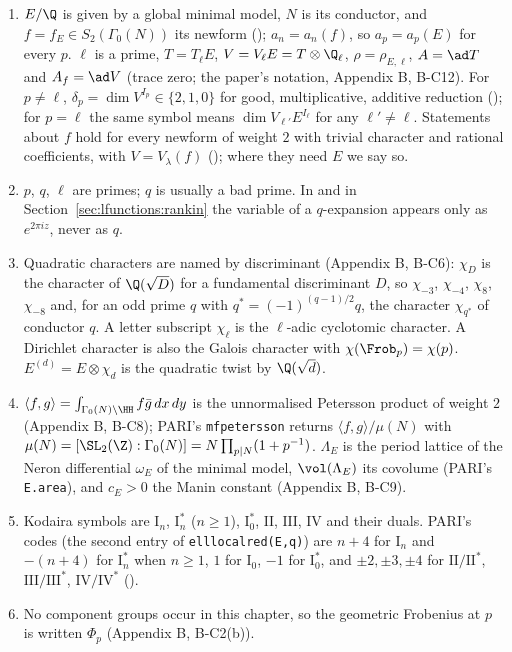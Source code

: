 \begin{convention}\label{conv:lfunctions:standing}
\begin{enumerate}[label=(\alph*)]
\item $E/\Q$ is given by a global minimal model, $N$ is its conductor, and $f=f_E\in S_2(\Gamma_0(N))$ its newform (); $a_n=a_n(f)$, so $a_p=a_p(E)$
for every $p$. $\ell$ is a prime, $T=T_\ell E$, $V=V_\ell E=T\otimes\Q_\ell$, $\rho=\rho_{E,\ell}$, $A=\ad T$ and $A_f=\ad V$ (trace zero; the paper's notation, Appendix B,
B-C12). For $p\ne\ell$, $\delta_p=\dim V^{I_p}\in\{2,1,0\}$ for good, multiplicative, additive reduction (); for $p=\ell$ the same symbol means
$\dim V_{\ell'}E^{I_\ell}$ for any $\ell'\ne\ell$. Statements about $f$ hold for every newform of weight $2$ with trivial character and rational coefficients,
with $V=V_\lambda(f)$ (); where they need $E$ we say so.
\item $p$, $q$, $\ell$ are primes; $q$ is usually a bad prime. In  and in Section~\ref{sec:lfunctions:rankin} the variable of a
$q$-expansion appears only as $e^{2\pi iz}$, never as $q$.
\item Quadratic characters are named by discriminant (Appendix B, B-C6): $\chi_D$ is the character of $\Q(\sqrt D)$ for a fundamental discriminant $D$, so
$\chi_{-3}$, $\chi_{-4}$, $\chi_8$, $\chi_{-8}$ and, for an odd prime $q$ with $q^*=(-1)^{(q-1)/2}q$, the character $\chi_{q^*}$ of conductor $q$. A letter subscript
$\chi_\ell$ is the $\ell$-adic cyclotomic character. A Dirichlet character is also the Galois character with $\chi(\Frob_p)=\chi(p)$. $E^{(d)}=E\otimes\chi_d$ is the
quadratic twist by $\Q(\sqrt d)$.
\item $\langle f,g\rangle=\int_{\Gamma_0(N)\backslash\HH}f\bar g\,dx\,dy$ is the unnormalised Petersson product of weight $2$ (Appendix B, B-C8); PARI's \texttt{mfpetersson} returns
$\langle f,g\rangle/\mu(N)$ with $\mu(N)=[\SL_2(\Z):\Gamma_0(N)]=N\prod_{p\mid N}(1+p^{-1})$. $\Lambda_E$ is the period lattice of the Neron differential $\omega_E$ of the
minimal model, $\vol(\Lambda_E)$ its covolume (PARI's \texttt{E.area}), and $c_E>0$ the Manin constant (Appendix B, B-C9).
\item Kodaira symbols are $\mathrm I_n$, $\mathrm I_n^*$ ($n\ge1$), $\mathrm I_0^*$, $\mathrm{II}$, $\mathrm{III}$, $\mathrm{IV}$ and their duals. PARI's codes (the second entry of
\texttt{elllocalred(E,q)}) are $n+4$ for $\mathrm I_n$ and $-(n+4)$ for $\mathrm I_n^*$ when $n\ge1$, $1$ for $\mathrm I_0$, $-1$ for $\mathrm I_0^*$, and $\pm2,\pm3,\pm4$ for $\mathrm{II}/\mathrm{II}^*$, $\mathrm{III}/\mathrm{III}^*$,
$\mathrm{IV}/\mathrm{IV}^*$ ().
\item No component groups occur in this chapter, so the geometric Frobenius at $p$ is written $\Phi_p$ (Appendix B, B-C2(b)).
\end{enumerate}
\end{convention}

